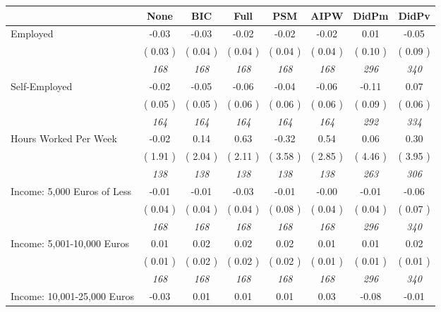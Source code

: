 \begin{tabular}{l c c c c c c c}
\toprule
 & None & BIC & Full & PSM & AIPW & DidPm & DidPv \\
\midrule
Employed &     -0.03 &     -0.03 &     -0.02 &     -0.02 &     -0.02 &      0.01 &     -0.05 \\
& (     0.03 ) & (     0.04 ) & (     0.04 ) & (     0.04 ) & (     0.04 ) & (     0.10 ) & (     0.09 ) \\
& \textit{ 168 } & \textit{ 168 } & \textit{ 168 } & \textit{ 168 } & \textit{ 168 } & \textit{ 296 } & \textit{ 340 } \\
Self-Employed &     -0.02 &     -0.05 &     -0.06 &     -0.04 &     -0.06 &     -0.11 &      0.07 \\
& (     0.05 ) & (     0.05 ) & (     0.06 ) & (     0.06 ) & (     0.06 ) & (     0.09 ) & (     0.06 ) \\
& \textit{ 164 } & \textit{ 164 } & \textit{ 164 } & \textit{ 164 } & \textit{ 164 } & \textit{ 292 } & \textit{ 334 } \\
Hours Worked Per Week &     -0.02 &      0.14 &      0.63 &     -0.32 &      0.54 &      0.06 &      0.30 \\
& (     1.91 ) & (     2.04 ) & (     2.11 ) & (     3.58 ) & (     2.85 ) & (     4.46 ) & (     3.95 ) \\
& \textit{ 138 } & \textit{ 138 } & \textit{ 138 } & \textit{ 138 } & \textit{ 138 } & \textit{ 263 } & \textit{ 306 } \\
Income: 5,000 Euros of Less &     -0.01 &     -0.01 &     -0.03 &     -0.01 &     -0.00 &     -0.01 &     -0.06 \\
& (     0.04 ) & (     0.04 ) & (     0.04 ) & (     0.08 ) & (     0.04 ) & (     0.04 ) & (     0.07 ) \\
& \textit{ 168 } & \textit{ 168 } & \textit{ 168 } & \textit{ 168 } & \textit{ 168 } & \textit{ 296 } & \textit{ 340 } \\
Income: 5,001-10,000 Euros &      0.01 &      0.02 &      0.02 &      0.02 &      0.01 &      0.01 &      0.02 \\
& (     0.01 ) & (     0.02 ) & (     0.02 ) & (     0.02 ) & (     0.01 ) & (     0.01 ) & (     0.01 ) \\
& \textit{ 168 } & \textit{ 168 } & \textit{ 168 } & \textit{ 168 } & \textit{ 168 } & \textit{ 296 } & \textit{ 340 } \\
Income: 10,001-25,000 Euros &     -0.03 &      0.01 &      0.01 &      0.01 &      0.03 &     -0.08 &     -0.01 \\

\end{tabular}
